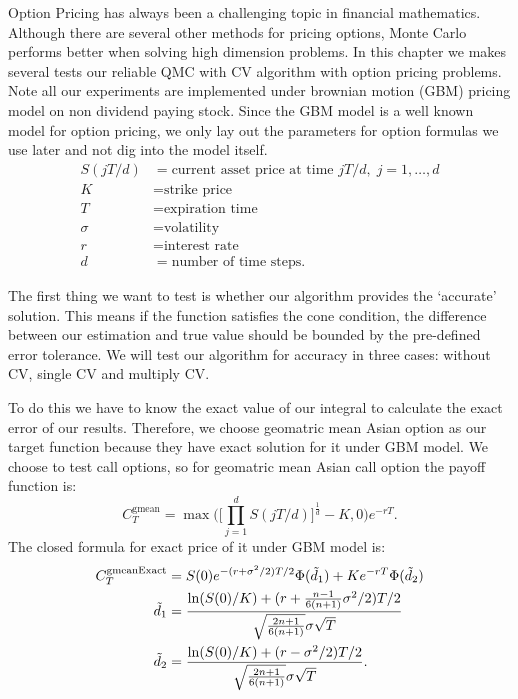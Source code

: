 
Option Pricing has always been a challenging topic in financial mathematics. 
Although there are several other methods for pricing options, Monte Carlo performs better when solving high dimension problems.
In this chapter we makes several tests our reliable QMC with CV algorithm with option pricing problems. 
Note all our experiments are implemented under brownian motion (GBM) pricing model on non dividend paying stock.  
Since the GBM model is a well known model for option pricing, we only lay out the parameters for option formulas we use later and not dig into the model itself. 
\begin{align*}
    S(jT/d)&=\text{current asset price at time $jT/d,\; j=1,\dots,d$}\\
    K&=\text{strike price}\\
    T&=\text{expiration time}\\
    \sigma&=\text{volatility}\\
    r&=\text{interest rate}\\
    d&=\text{number of time steps}.
\end{align*}


The first thing we want to test is whether our algorithm provides the `accurate' solution. This means if the function satisfies the cone condition, the difference between our estimation and true value should be bounded by the pre-defined error tolerance. We will test our algorithm for accuracy in three cases: without CV, single CV and multiply CV. 

To do this we have to know the exact value of our integral to calculate the exact error of our results. 
Therefore, we choose geomatric mean Asian option as our target function because they have exact solution for it under GBM model. We choose to test call options, so for geomatric mean Asian call option the payoff function is:   
\[ C_{T}^{\mathrm{gmean}} = \max\Big(\Big[\prod_{j=1}^{d}S(jT/d) \Big]^\frac{1}{d}-K, 0\Big)e^{-rT}.\]
The closed formula for exact price of it under GBM model is: 
\begin{align}
    C_{T}^{\mathrm{gmeanExact}} 
    &= S(0)e^{-(r+\sigma^2/2)T/2}\Phi(\tilde{d}_1)+Ke^{-rT}\Phi(\tilde{d}_2)    \label{eq:exactgmean}\\
    \tilde{d}_1 &=\frac{\ln(S(0)/K)+(r+\frac{n-1}{6(n+1)}\sigma^2/2)T/2}
    {\sqrt{\frac{2n+1}{6(n+1)}}\sigma\sqrt{T}}\notag\\
    \tilde{d}_2 &=\frac{\ln(S(0)/K)+(r-\sigma^2/2)T/2}
            {\sqrt{\frac{2n+1}{6(n+1)}}\sigma\sqrt{T}}\notag.
\end{align}

